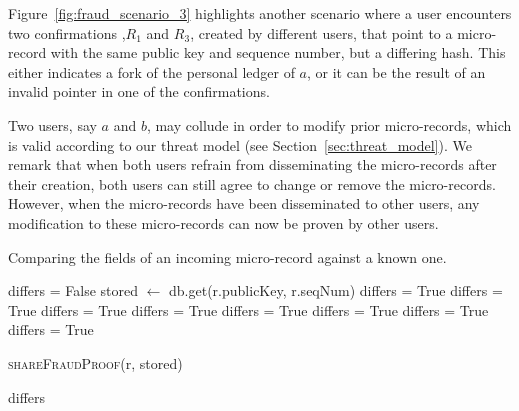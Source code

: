 Figure~\ref{fig:fraud_scenario_3} highlights another scenario where a user encounters two confirmations ,$ R_1 $ and $ R_3 $, created by different users, that point to a micro-record with the same public key and sequence number, but a differing hash.
This either indicates a fork of the personal ledger of $ a $, or it can be the result of an invalid pointer in one of the confirmations.


Two users, say $ a $ and $ b $, may collude in order to modify prior micro-records, which is valid according to our threat model (see Section~\ref{sec:threat_model}).
We remark that when both users refrain from disseminating the micro-records after their creation, both users can still agree to change or remove the micro-records.
However, when the micro-records have been disseminated to other users, any modification to these micro-records can now be proven by other users.

\begin{algorithm}[b]
	\label{alg:record_validation_step2}
	\caption{Comparing the fields of an incoming micro-record against a known one.}
	\begin{algorithmic}[1]
		  
		\State differs = False
		\State stored $ \leftarrow$ db.get(r.publicKey, r.seqNum)
		\State differs = True
		\EndIf
		\State differs = True
		\EndIf
		\State differs = True
		\EndIf
		\State differs = True
		\EndIf
		\State differs = True
		\EndIf
		\State differs = True
		\EndIf
		\State differs = True
		\EndIf
		\State differs = True
		\EndIf
		
		\State \textsc{shareFraudProof}(r, stored)
		\EndIf
		
		\State \Return differs
		
		\EndProcedure
		
	\end{algorithmic}
\end{algorithm}

